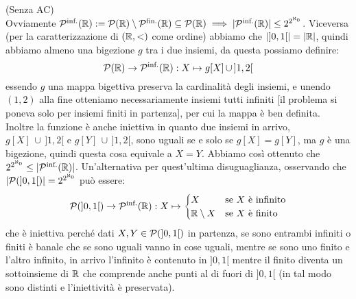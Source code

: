 \begin{soln}
	(Senza AC)\\
	Ovviamente $\mathcal{P}^{\text{inf.}}(\mathbb R) := \mathcal{P}(\mathbb R)\setminus\mathcal{P}^{\text{fin.}}(\mathbb R) \subseteq \mathcal{P}(\mathbb R) \implies |\mathcal{P}^{\text{inf.}}(\mathbb R)|\leq 2^{2^{\aleph_0}}$. Viceversa (per la caratterizzazione di $(\mathbb R,<)$ come ordine) abbiamo che $|]0,1[| = |\mathbb R|$,
	quindi abbiamo almeno una bigezione $g$ tra i due insiemi, da questa possiamo definire:
	\[ \mathcal{P}(\mathbb R) \to \mathcal{P}^{\text{inf.}}(\mathbb R) : X \mapsto g[X] \, \cup \, ]1,2[
		\]
	essendo $g$ una mappa bigettiva preserva la cardinalità degli insiemi, e unendo $(1,2)$ alla fine otteniamo necessariamente insiemi tutti infiniti [il problema si poneva solo per insiemi finiti in partenza], per cui la mappa è ben definita.
	Inoltre la funzione è anche iniettiva in quanto due insiemi in arrivo, $g[X] \,\cup\, ]1,2[$ e $g[Y] \,\cup \,]1,2[$, sono uguali se e solo se $g[X] = g[Y]$, ma $g$ è una bigezione,
	quindi questa cosa equivale a $X = Y$. Abbiamo così ottenuto che $2^{2^{\aleph_0}} \leq |\mathcal{P}^{\text{inf.}}(\mathbb R)|$. Un'alternativa per quest'ultima disuguaglianza, osservando che $|\mathcal{P}(]0,1[)| = 2^{2^{\aleph_0}}$ può essere:
	\[ \mathcal{P}(]0,1[) \to \mathcal{P}^{\text{inf.}}(\mathbb R) : X \mapsto \begin{cases}
		X &\text{se $X$ è infinito} \\
		\mathbb R \setminus X &\text{se $X$ è finito}
	\end{cases}
		\]
	che è iniettiva perché dati $X,Y \in \mathcal{P}(]0,1[)$ in partenza, se sono entrambi infiniti o finiti è banale che se sono uguali vanno in cose uguali, mentre se sono uno finito e l'altro infinito, in arrivo l'infinito è contenuto in $]0,1[$ mentre il finito diventa un sottoinsieme di $\mathbb R$ che comprende anche punti al di fuori di $]0,1[$ (in tal modo sono distinti e l'iniettività è preservata).
\end{soln}

